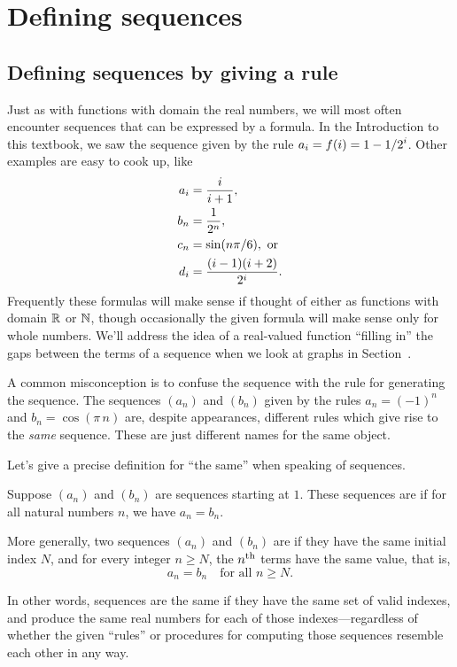 \section{Defining sequences}
\label{section:defining-sequences}

\subsection{Defining sequences by giving a rule}

Just as with functions with domain the real numbers, we will most
often encounter sequences that can be expressed by a formula.  In the
Introduction to this textbook, we saw the sequence given by the rule $\displaystyle
a_i=f(i)=1-1/2^i$.  Other examples are easy to cook up, like
\begin{align*}
  a_i &={i\over i+1}, \\
  b_n &={1\over2^n}, \\
  c_n &=\sin(n\pi/6), \mbox{ or} \\
  d_i &={(i-1)(i+2)\over2^i}. \\
\end{align*}
Frequently these formulas will make sense if thought of either as
functions with domain $\mathbb{R}$ or $\mathbb{N}$, though occasionally the given
formula will make sense only for whole numbers.  We'll address the
idea of a real-valued function ``filling in'' the gaps between the
terms of a sequence when we look at graphs in
Section~.

\begin{warning}
  A common misconception is to confuse the sequence with the rule for
  generating the sequence.  The sequences $(a_n)$ and $(b_n)$ given by
  the rules $a_n = (-1)^n$ and $b_n = \cos (\pi \, n)$ are, despite
  appearances, different rules which give rise to the \textit{same}
  sequence.  These are just different names for the same object.
\end{warning}

Let's give a precise definition for ``the same'' when speaking of sequences.


\begin{definition}
  Suppose $(a_n)$ and $(b_n)$ are sequences starting at $1$.  These
  sequences are  if for all
  natural numbers $n$, we have $a_n = b_n$.

  More generally, two sequences $(a_n)$ and $(b_n)$ are
   if they have the same initial index $N$, and for
  every integer $n \geq N$, the $n^{\mbox{\scriptsize th}}$ terms have the same value, that is,
  \[
  a_n = b_n \quad \mbox{for all $n \geq N$.}
  \]
\end{definition}
In other words, sequences are the same if they have the same set of
valid indexes, and produce the same real numbers for each of those
indexes---regardless of whether the given ``rules'' or procedures for
computing those sequences resemble each other in any way.

